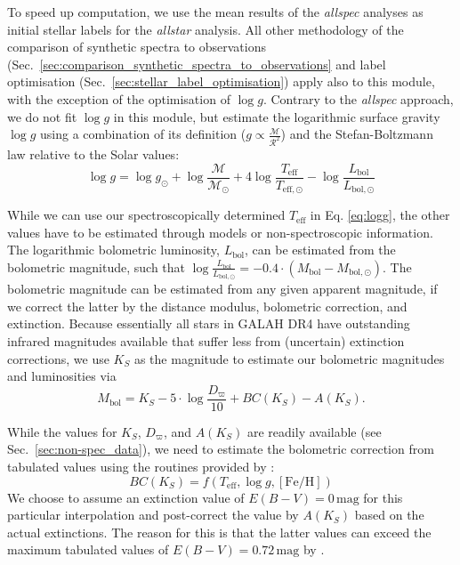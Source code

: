 \documentclass[
  journal=pasa,
  manuscript=research-paper, %
  year=2024,
  volume=37
]{cup-journal}
\newcommand{\logg}{$\log g$\xspace}
\begin{document}
To speed up computation, we use the mean results of the \textit{allspec} analyses as initial stellar labels for the \textit{allstar} analysis. All other methodology of the comparison of synthetic spectra to observations (Sec.~\ref{sec:comparison_synthetic_spectra_to_observations} and label optimisation (Sec.~\ref{sec:stellar_label_optimisation}) apply also to this module, with the exception of the optimisation of \logg. Contrary to the \textit{allspec} approach, we do not fit \logg in this module, but estimate the logarithmic surface gravity $\log g$ using a combination of its definition ($g \propto \frac{\mathcal{M}}{\mathcal{R}^2}$) and the Stefan-Boltzmann law relative to the Solar values:
\begin{equation}
\log g = \log g_\odot + \log \frac{\mathcal{M}}{\mathcal{M_\odot}} + 4 \log \frac{T_\mathrm{eff}}{T_\mathrm{eff,\odot}} - \log \frac{L_\mathrm{bol}}{L_\mathrm{bol,\odot}} \label{eq:logg}
\end{equation}

While we can use our spectroscopically determined $T_\mathrm{eff}$ in Eq. \ref{eq:logg}, the other values have to be estimated through models or non-spectroscopic information. The logarithmic bolometric luminosity, $L_\mathrm{bol}$, can be estimated from the bolometric magnitude, such that $\log \frac{L_\mathrm{bol}}{L_\mathrm{bol,\odot}} = -0.4 \cdot \left(M_\mathrm{bol} - M_\mathrm{bol,\odot} \right)$. The bolometric magnitude can be estimated from any given apparent magnitude, if we correct the latter by the distance modulus, bolometric correction, and extinction. Because essentially all stars in GALAH DR4 have outstanding infrared magnitudes available that suffer less from (uncertain) extinction corrections, we use $K_S$ as the magnitude to estimate our bolometric magnitudes and luminosities via
\begin{equation}
M_\mathrm{bol} = K_S - 5\cdot \log \frac{D_\varpi}{10} + BC(K_S) - A(K_S). \label{eq:mbol}
\end{equation}

While the values for $K_S$, $D_\varpi$, and $A(K_S)$ are readily available (see Sec.~\ref{sec:non-spec_data}), we need to estimate the bolometric correction from tabulated values using the routines provided by \citet{Casagrande2018}:
\begin{equation}
BC(K_S) = f(T_\mathrm{eff}, \log g, \mathrm{[Fe/H]})
\label{eq:bc_ks}
\end{equation}
We choose to assume an extinction value of $E(B-V) = 0\,\mathrm{mag}$ for this particular interpolation and post-correct the value by $A(K_S)$ based on the actual extinctions. The reason for this is that the latter values can exceed the maximum tabulated values of $E(B-V) = 0.72\,\mathrm{mag}$ by \citet{Casagrande2018}.
\end{document}
